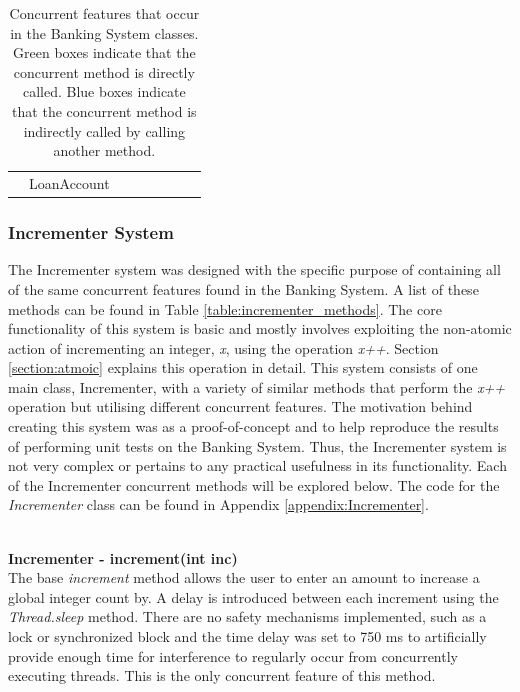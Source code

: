 \documentclass[a4paper,12pt]{article}
\begin{document}
\begin{table}[]
\begin{tabular}{lcllllll}
\multicolumn{1}{l|}{}                                                                                         & \multicolumn{1}{c|}{LoanAccount}    & \multicolumn{1}{l|}{\cellcolor[HTML]{32CB00}} & \multicolumn{1}{l|}{\cellcolor[HTML]{32CB00}} & \multicolumn{1}{l|}{\cellcolor[HTML]{31A4FF}} & \multicolumn{1}{l|}{\cellcolor[HTML]{31A4FF}} & \multicolumn{1}{l|}{\cellcolor[HTML]{31A4FF}} & \multicolumn{1}{l|}{\cellcolor[HTML]{31A4FF}} \\ \cline{2-8} 
\end{tabular}
\caption{Concurrent features that occur in the Banking System classes. Green boxes indicate that the concurrent method is directly called. Blue boxes indicate that the concurrent method is indirectly called by calling another method.}
\label{table:bank_concurrent_classes}
\end{table}


\subsubsection{Incrementer System}
The Incrementer system was designed with the specific purpose of containing all of the same concurrent features found in the Banking System. A list of these methods can be found in Table \ref{table:incrementer_methods}. The core functionality of this system is basic and mostly involves exploiting the non-atomic action of incrementing an integer, \textit{x}, using the operation \textit{x++}. Section \ref{section:atmoic} explains this operation in detail. This system consists of one main class, Incrementer, with a variety of similar methods that perform the \textit{x++} operation but utilising different concurrent features. The motivation behind creating this system was as a proof-of-concept and to help reproduce the results of performing unit tests on the Banking System. Thus, the Incrementer system is not very complex or pertains to any practical usefulness in its functionality. Each of the Incrementer concurrent methods will be explored below. The code for the \textit{Incrementer} class can be found in Appendix \ref{appendix:Incrementer}. 
	   
\textbf{\\Incrementer - increment(int inc)}	    
\\The base \textit{increment} method allows the user to enter an amount to increase a global integer count by. A delay is introduced between each increment using the \textit{Thread.sleep} method. There are no safety mechanisms implemented, such as a lock or synchronized block and  the time delay was set to 750 ms to artificially provide enough time for interference to regularly occur from concurrently executing threads. This is the only concurrent feature of this method.
\end{document}
